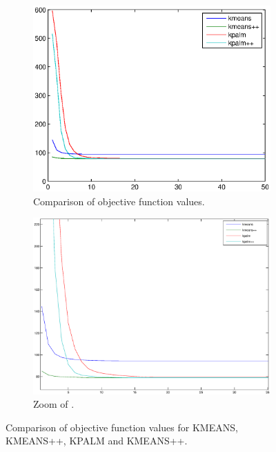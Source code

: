 \documentclass[11pt]{article}
\numberwithin{equation}{section}
\begin{document}

\begin{figure}[ht]
    \centering
    \begin{subfigure}[b]{0.55\textwidth}
        \includegraphics[width=\textwidth]{psi_algs_comparison2}
        \caption{Comparison of objective function values.}
        \label{fig:algs_psi_comp_A}
    \end{subfigure}
    \begin{subfigure}[b]{0.56\textwidth}
        \includegraphics[width=\textwidth]{psi_algs_comparison2_zoom}
        \caption{Zoom of .}
        \label{fig:algs_psi_comp_B}
    \end{subfigure}
    \caption{Comparison of objective function values for KMEANS, KMEANS++, KPALM and KMEANS++.} \label{fig:algs_psi_comp}
\end{figure}
\end{document}
